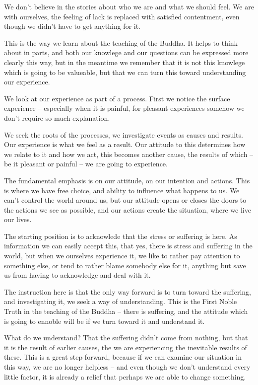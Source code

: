 We don't believe in the stories about who we are and what we should
feel. We are with ourselves, the feeling of lack is replaced with
satisfied contentment, even though we didn't have to get anything for
it.

This is the way we learn about the teaching of the Buddha. It helps to
think about in parts, and both our knowlege and our questions can be
expressed more clearly this way, but in the meantime we remember that it
is not this knowlege which is going to be valueable, but that we can
turn this toward understanding our experience.

We look at our experience as part of a process. First we notice the
surface experience -- especially when it is painful, for pleasant
experiences somehow we don't require so much explanation.

We seek the roots of the processes, we investigate events as causes and
results. Our experience is what we feel as a result. Our attitude to
this determines how we relate to it and how we act, this becomes another
cause, the results of which -- be it pleasant or painful -- we are going
to experience.

The fundamental emphasis is on our attitude, on our intention and
actions. This is where we have free choice, and ability to influence
what happens to us. We can't control the world around us, but our
attitude opens or closes the doors to the actions we see as possible,
and our actions create the situation, where we live our lives.

The starting position is to acknowlede that the stress or suffering is
here. As information we can easily accept this, that yes, there is
stress and suffering in the world, but when we ourselves experience it,
we like to rather pay attention to something else, or tend to rather
blame somebody else for it, anything but save us from having to
acknowledge and deal with it.

The instruction here is that the only way forward is to turn toward the
suffering, and investigating it, we seek a way of understanding. This is
the First Noble Truth in the teaching of the Buddha -- there is
suffering, and the attitude which is going to ennoble will be if we turn
toward it and understand it.

What do we understand? That the suffering didn't come from nothing, but
that it is the result of earlier causes, the we are experiencing the
inevitable results of these. This is a great step forward, because if we
can examine our situation in this way, we are no longer helpless -- and
even though we don't understand every little factor, it is already a
relief that perhaps we are able to change something.

